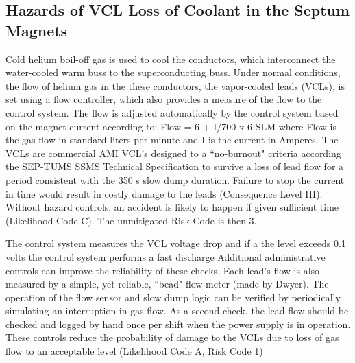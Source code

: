 {\begin{safetyen}{10}{15}
\subsection {\bf Hazards of VCL Loss of Coolant in the Septum Magnets}
\end{safetyen}

Cold helium boil-off gas is used to cool the conductors, which interconnect the water-cooled warm buss to 
the superconducting buss.  Under normal conditions, the flow of helium gas in the these conductors, the 
vapor-cooled leads (VCLs), is set using a flow controller, which also provides a measure of the flow to 
the control system.  The flow is adjusted automatically by the control system based on the magnet current 
according to:
Flow = 6 +   I/700 x 6 SLM
where Flow is the gas flow in standard liters per minute and I is the current in Amperes.  The VCLs are 
commercial AMI VCL's  designed  to a ``no-burnout" criteria according the SEP-TUMS SSMS Technical Specification 
to survive a loss of lead flow for a period consistent with the 350 s slow dump duration.  Failure to stop the 
current in time would result in costly damage to the leads (Consequence Level III).  Without hazard controls, 
an accident is likely to happen if given sufficient time (Likelihood Code C).  The unmitigated Risk Code is then 3.

The control system measures the VCL voltage drop and if a the level exceeds 0.1 volts the control system performs 
a fast discharge  Additional administrative controls can improve the reliability of these checks.  Each lead's 
flow is also measured by a simple, yet reliable, ``bead" flow meter (made by Dwyer).  The operation of the flow 
sensor and slow dump logic can be verified by periodically simulating an interruption in gas flow.  As a second 
check, the lead flow should be checked and logged by hand once per shift when the power supply is in operation.  
These controls reduce the probability of damage to the VCLs due to loss of gas flow to an acceptable level 
(Likelihood Code A, Risk Code 1) 

} %

